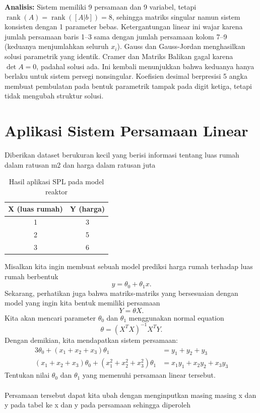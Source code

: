 \documentclass[12pt,a4paper]{report}
\begin{document}
\textbf{Analisis:} Sistem memiliki 9 persamaan dan 9 variabel, tetapi $\operatorname{rank}(A)=\operatorname{rank}([A|b])=8$, sehingga matriks singular namun sistem konsisten dengan 1 parameter bebas. Ketergantungan linear ini wajar karena jumlah persamaan baris 1--3 sama dengan jumlah persamaan kolom 7--9 (keduanya menjumlahkan seluruh $x_i$). Gauss dan Gauss-Jordan menghasilkan solusi parametrik yang identik. Cramer dan Matriks Balikan gagal karena $\det A=0$, padahal solusi ada. Ini kembali menunjukkan bahwa keduanya hanya berlaku untuk sistem persegi nonsingular. Koefisien desimal berpresisi 5 angka membuat pembulatan pada bentuk parametrik tampak pada digit ketiga, tetapi tidak mengubah struktur solusi.
 
 
\section{Aplikasi Sistem Persamaan Linear}
 
Diberikan dataset berukuran kecil yang berisi informasi tentang luas rumah dalam ratusan m2 dan harga
dalam ratusan juta

\begin{table}[H]
    \centering
    \caption{Hasil aplikasi SPL pada model reaktor}
    \begin{tabular}{|c|c|}
        \hline
        \textbf{X (luas rumah)} & \textbf{Y (harga)} \\
        \hline
        1 & 3 \\
        2 & 5 \\
        3 & 6 \\
        \hline
    \end{tabular}
\end{table}
 
Misalkan kita ingin membuat sebuah model prediksi harga rumah terhadap luas rumah berbentuk
\[
y = \theta_0 + \theta_1 x.
\]
Sekarang, perhatikan juga bahwa matriks-matriks yang bersesuaian dengan model yang ingin kita bentuk memiliki persamaan
\[
Y = \theta X.
\]
Kita akan mencari parameter \(\theta_0\) dan \(\theta_1\) menggunakan normal equation
\[
\theta = (X^T X)^{-1} X^T Y.
\]
Dengan demikian, kita mendapatkan sistem persamaan:
\begin{align*}
3\theta_0 + (x_1 + x_2 + x_3)\theta_1 &= y_1 + y_2 + y_3 \\
(x_1 + x_2 + x_3)\theta_0 + (x_1^2 + x_2^2 + x_3^2)\theta_1 &= x_1y_1 + x_2y_2 + x_3y_3
\end{align*}
Tentukan nilai \(\theta_0\) dan \(\theta_1\) yang memenuhi persamaan linear tersebut.
\\ \\
Persamaan tersebut dapat kita ubah dengan menginputkan masing masing x dan y pada tabel ke x dan y pada persamaan sehingga diperoleh
\end{document}
